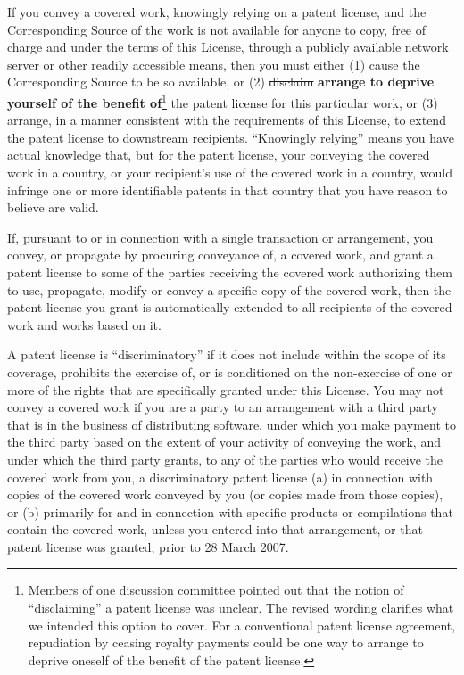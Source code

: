 \documentclass[11pt]{article}
\newcounter{v2section}
\newcounter{v3section}
\begin{document}
  If you convey a covered work, knowingly relying on a patent license,
and the Corresponding Source of the work is not available for anyone to
copy, free of charge and under the terms of this License, through a
publicly available network server or other readily accessible means,
then you must either (1) cause the Corresponding Source to be so
available, or (2) \sout{disclaim} \textbf{arrange to deprive yourself of
the benefit of}\footnote{Members of one discussion committee pointed out
that the notion of ``disclaiming'' a patent license was unclear.  The
revised wording clarifies what we intended this option to cover.  For a
conventional patent license agreement, repudiation by ceasing royalty
payments could be one way to arrange to deprive oneself of the benefit
of the patent license.} the patent license for this particular work, or
(3) arrange, in a manner consistent with the requirements of this
License, to extend the patent license to downstream
recipients. ``Knowingly relying'' means you have actual knowledge that,
but for the patent license, your conveying the covered work in a
country, or your recipient's use of the covered work in a country, would
infringe one or more identifiable patents in that country that you have
reason to believe are valid.

  If, pursuant to or in connection with a single transaction or
arrangement, you convey, or propagate by procuring conveyance of, a
covered work, and grant a patent license to some of the parties
receiving the covered work authorizing them to use, propagate, modify
or convey a specific copy of the covered work, then the patent license
you grant is automatically extended to all recipients of the covered
work and works based on it.

  A patent license is ``discriminatory'' if it does not include within
the scope of its coverage, prohibits the exercise of, or is conditioned
on the non-exercise of one or more of the rights that are specifically
granted under this License.  You may not convey a covered work if you
are a party to an arrangement with a third party that is in the business
of distributing software, under which you make payment to the third
party based on the extent of your activity of conveying the work, and
under which the third party grants, to any of the parties who would
receive the covered work from you, a discriminatory patent license (a)
in connection with copies of the covered work conveyed by you (or copies
made from those copies), or (b) primarily for and in connection with
specific products or compilations that contain the covered work, unless
you entered into that arrangement, or that patent license was granted,
prior to 28 March 2007.
\end{document}
